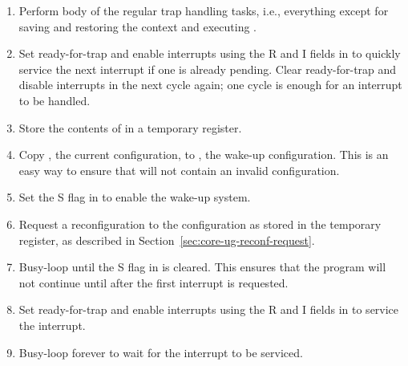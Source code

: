 \begin{enumerate}

\item Perform body of the regular trap handling tasks, i.e., everything except 
for saving and restoring the context and executing .

\item Set ready-for-trap and enable interrupts using the R and I fields in 
 to quickly service the next interrupt if one is already pending.
Clear ready-for-trap and disable interrupts in the next cycle again; one cycle
is enough for an interrupt to be handled.

\item Store the contents of  in a temporary register.

\item Copy , the current configuration, to , the wake-up
configuration. This is an easy way to ensure that  will not contain
an invalid configuration.

\item Set the S flag in  to enable the wake-up system.

\item Request a reconfiguration to the configuration as stored in the temporary
register, as described in Section~\ref{sec:core-ug-reconf-request}.

\item Busy-loop until the S flag in  is cleared. This ensures that
the program will not continue until after the first interrupt is requested.

\item Set ready-for-trap and enable interrupts using the R and I fields in 
 to service the interrupt.

\item Busy-loop forever to wait for the interrupt to be serviced.

\end{enumerate}






